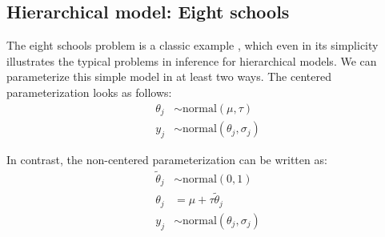 \documentclass[american,]{article}
\theoremstyle{definition}
\begin{document}



\hypertarget{eightschools}{%
\subsection{Hierarchical model: Eight schools}\label{eightschools}}

The eight schools problem is a classic example
\citep[see Section 5.5 in][]{BDA3}, which even in its
simplicity illustrates the typical problems in inference for
hierarchical models. We can parameterize this simple model
in at least two ways. The centered parameterization looks as follows:
\begin{align*}
\theta_j &\sim \text{normal}(\mu, \tau) \\
y_j &\sim \text{normal}(\theta_j, \sigma_j)
\end{align*}

In contrast, the non-centered parameterization can be written as:
\begin{align*}
\tilde{\theta}_j &\sim \text{normal}(0, 1) \\
\theta_j &= \mu + \tau \tilde{\theta}_j \\
y_j &\sim \text{normal}(\theta_j, \sigma_j)
\end{align*}
\end{document}
